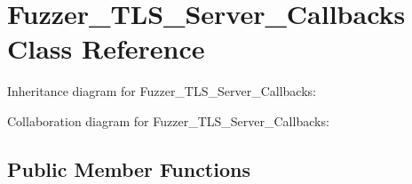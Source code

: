 \hypertarget{class_fuzzer___t_l_s___server___callbacks}{}\section{Fuzzer\+\_\+\+T\+L\+S\+\_\+\+Server\+\_\+\+Callbacks Class Reference}
\label{class_fuzzer___t_l_s___server___callbacks}


Inheritance diagram for Fuzzer\+\_\+\+T\+L\+S\+\_\+\+Server\+\_\+\+Callbacks\+:


Collaboration diagram for Fuzzer\+\_\+\+T\+L\+S\+\_\+\+Server\+\_\+\+Callbacks\+:
\subsection*{Public Member Functions}
